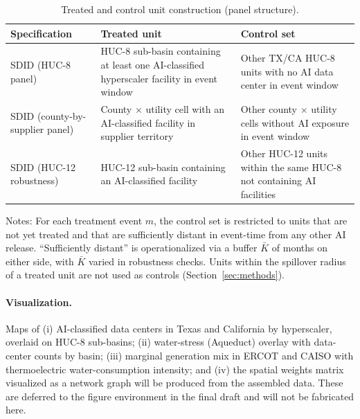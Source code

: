 \documentclass[11pt, letterpaper]{article}
\begin{document}
\begin{table}[htbp]
\centering
\caption{Treated and control unit construction (panel structure).}
\label{tab:UnitConstruction}
\begin{threeparttable}
\begin{tabularx}{\linewidth}{lXX}
\toprule
\textbf{Specification} & \textbf{Treated unit} & \textbf{Control set} \\
\midrule
SDID (HUC-8 panel) & HUC-8 sub-basin containing at least one AI-classified hyperscaler facility in event window & Other TX/CA HUC-8 units with no AI data center in event window \\
SDID (county-by-supplier panel) & County $\times$ utility cell with an AI-classified facility in supplier territory & Other county $\times$ utility cells without AI exposure in event window \\
SDID (HUC-12 robustness) & HUC-12 sub-basin containing an AI-classified facility & Other HUC-12 units within the same HUC-8 not containing AI facilities \\
\bottomrule
\end{tabularx}
\begin{tablenotes}
\footnotesize
\item Notes: For each treatment event $m$, the control set is restricted to units that are not yet treated and that are sufficiently distant in event-time from any other AI release. ``Sufficiently distant'' is operationalized via a buffer $\bar{K}$ of months on either side, with $\bar{K}$ varied in robustness checks. Units within the spillover radius of a treated unit are not used as controls (Section~\ref{sec:methods}).
\end{tablenotes}
\end{threeparttable}
\end{table}

\paragraph{Visualization.} Maps of (i) AI-classified data centers in Texas and California by hyperscaler, overlaid on HUC-8 sub-basins; (ii) water-stress (Aqueduct) overlay with data-center counts by basin; (iii) marginal generation mix in ERCOT and CAISO with thermoelectric water-consumption intensity; and (iv) the spatial weights matrix visualized as a network graph will be produced from the assembled data. These are deferred to the figure environment in the final draft and will not be fabricated here.
\end{document}
